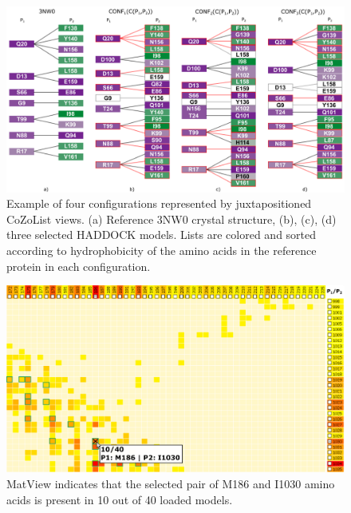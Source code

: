 \documentclass{bmcart}
\begin{document}
\begin{backmatter}
\begin{figure}[h!]
    \centering
    \includegraphics[width=\columnwidth]{images/figure9.pdf}
    \caption{ Example of four configurations represented by juxtapositioned CoZoList views. (a) Reference 3NW0 crystal structure, (b), (c), (d) three selected HADDOCK models. Lists are colored and sorted according to hydrophobicity of the amino acids in the reference protein in each configuration.}
  \label{fig:case3}
\end{figure}

\begin{figure}[h!]
  \centering
  \includegraphics[width=\columnwidth]{images/figure10.pdf}
  \caption{ MatView indicates that the selected pair of M186 and I1030 amino acids is present in 10 out of 40 loaded models.}
  \label{fig:coiled_haddock_mat}
\end{figure}


\end{backmatter}
\end{document}
